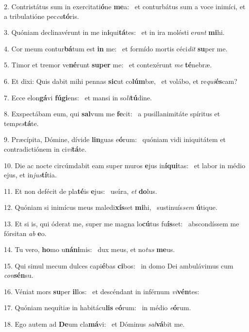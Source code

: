 2. Contristátus sum in exercitati\textbf{ó}ne \textbf{me}a: \ast\  et conturbátus sum a voce inimíci, et a tribulatióne pec\textit{ca}\textbf{tó}ris.\

3. Quóniam declinavérunt in me in\textbf{i}qui\textbf{tá}tes: \ast\  et in ira molésti e\textit{rant} \textbf{mi}hi.\

4. Cor meum contur\textbf{bá}tum est \textbf{in} me: \ast\  et formído mortis céci\textit{dit} \textbf{su}per me.\

5. Timor et tremor ve\textbf{né}runt \textbf{su}\textbf{per} me: \ast\  et contexérunt \textit{me} \textbf{té}nebræ.\

6. Et dixi: Quis dabit mihi pennas \textbf{sic}ut co\textbf{lúm}bæ, \ast\  et volábo, et re\textit{qui}\textbf{és}cam?\

7. Ecce elon\textbf{gá}vi \textbf{fú}\textbf{gi}ens: \ast\  et mansi in so\textit{li}\textbf{tú}dine.\

8. Exspectábam eum, qui \textbf{sal}vum me \textbf{fe}cit: \ast\  a pusillanimitáte spíritus et tem\textit{pes}\textbf{tá}te.\

9. Præcípita, Dómine, dívide \textbf{lin}guas e\textbf{ó}rum: \ast\  quóniam vidi iniquitátem et contradictiónem in ci\textit{vi}\textbf{tá}te.\

10. Die ac nocte circúmdabit eam super muros \textbf{e}jus in\textbf{í}\textbf{qui}tas: \ast\  et labor in médio ejus, et in\textit{jus}\textbf{tí}tia.\

11. Et non defécit de pla\textbf{té}is \textbf{e}jus: \ast\  usúra, \textit{et} \textbf{do}lus.\

12. Quóniam si inimícus meus maledi\textbf{xís}set \textbf{mi}hi, \ast\  sustinuís\textit{sem} \textbf{ú}tique.\

13. Et si is, qui óderat me, super me magna lo\textbf{cú}tus fu\textbf{ís}set: \ast\  abscondíssem me fórsitan \textit{ab} \textbf{e}o.\

14. Tu vero, \textbf{ho}mo u\textbf{ná}\textbf{ni}mis: \ast\  dux meus, et no\textit{tus} \textbf{me}us.\

15. Qui simul mecum dulces capi\textbf{é}bas \textbf{ci}bos: \ast\  in domo Dei ambulávimus cum \textit{con}\textbf{sén}su.\

16. Véniat mors \textbf{su}per \textbf{il}los: \ast\  et descéndant in inférnum \textit{vi}\textbf{vén}tes:\

17. Quóniam nequítiæ in habitácu\textbf{lis} e\textbf{ó}rum: \ast\  in médio \textit{e}\textbf{ó}rum.\

18. Ego autem ad \textbf{De}um cla\textbf{má}vi: \ast\  et Dóminus \textit{sal}\textbf{vá}bit me.\


